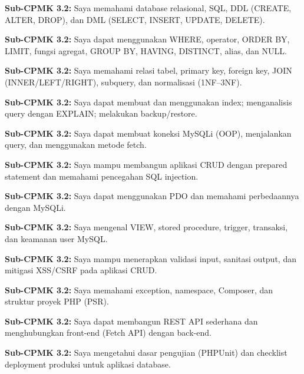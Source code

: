 \documentclass[../main.tex]{subfiles}
\begin{document}
\begin{checklist}
  \item \textbf{Sub-CPMK 3.2:} Saya memahami database relasional, SQL, DDL (CREATE, ALTER, DROP), dan DML (SELECT, INSERT, UPDATE, DELETE).
  \item \textbf{Sub-CPMK 3.2:} Saya dapat menggunakan WHERE, operator, ORDER BY, LIMIT, fungsi agregat, GROUP BY, HAVING, DISTINCT, alias, dan NULL.
  \item \textbf{Sub-CPMK 3.2:} Saya memahami relasi tabel, primary key, foreign key, JOIN (INNER/LEFT/RIGHT), subquery, dan normalisasi (1NF--3NF).
  \item \textbf{Sub-CPMK 3.2:} Saya dapat membuat dan menggunakan index; menganalisis query dengan EXPLAIN; melakukan backup/restore.
  \item \textbf{Sub-CPMK 3.2:} Saya dapat membuat koneksi MySQLi (OOP), menjalankan query, dan menggunakan metode fetch.
  \item \textbf{Sub-CPMK 3.2:} Saya mampu membangun aplikasi CRUD dengan prepared statement dan memahami pencegahan SQL injection.
  \item \textbf{Sub-CPMK 3.2:} Saya dapat menggunakan PDO dan memahami perbedaannya dengan MySQLi.
  \item \textbf{Sub-CPMK 3.2:} Saya mengenal VIEW, stored procedure, trigger, transaksi, dan keamanan user MySQL.
  \item \textbf{Sub-CPMK 3.2:} Saya mampu menerapkan validasi input, sanitasi output, dan mitigasi XSS/CSRF pada aplikasi CRUD.
  \item \textbf{Sub-CPMK 3.2:} Saya memahami exception, namespace, Composer, dan struktur proyek PHP (PSR).
  \item \textbf{Sub-CPMK 3.2:} Saya dapat membangun REST API sederhana dan menghubungkan front-end (Fetch API) dengan back-end.
  \item \textbf{Sub-CPMK 3.2:} Saya mengetahui dasar pengujian (PHPUnit) dan checklist deployment produksi untuk aplikasi database.
\end{checklist}
\end{document}
